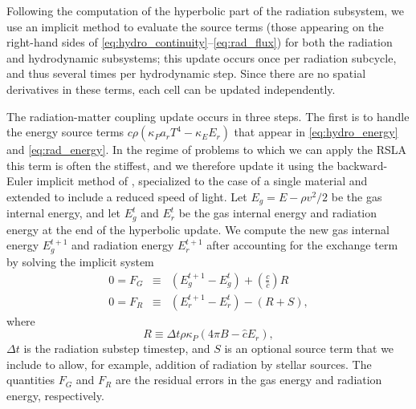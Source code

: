 \documentclass[fleqn,usenatbib]{mnras}
\begin{document}
Following the computation of the hyperbolic part of the radiation subsystem, we use an implicit method to evaluate the source terms (those appearing on the right-hand sides of \autoref{eq:hydro_continuity}--\autoref{eq:rad_flux}) for both the radiation and hydrodynamic subsystems; this update occurs once per radiation subcycle, and thus several times per hydrodynamic step. Since there are no spatial derivatives in these terms, each cell can be updated independently.

The radiation-matter coupling update occurs in three steps. The first is to handle the energy source terms $c\rho (\kappa_P a_r T^4 - \kappa_E E_r)$ that appear in \autoref{eq:hydro_energy} and \autoref{eq:rad_energy}. In the regime of problems to which we can apply the RSLA this term is often the stiffest, and we therefore update it using the backward-Euler implicit method of \cite{Howell_2003}, specialized to the case of a single material and extended to include a reduced speed of light. Let $E_g = E - \rho v^2/2$ be the gas internal energy, and let $E_g^t$ and $E_r^t$ be the gas internal energy and radiation energy at the end of the hyperbolic update. We compute the new gas internal energy $E_g^{t+1}$ and radiation energy $E_r^{t+1}$ after accounting for the exchange term by solving the implicit system
\begin{eqnarray}
0 = F_G &\equiv &(E_g^{t+1} - E_g^{t}) + \left( \frac{c}{\hat c} \right) R \\
0 = F_R &\equiv & (E_{r}^{t+1} - E_{r}^{t}) - \left( R + S \right),
\end{eqnarray}
where 
\begin{equation}
R \equiv \Delta t \rho \kappa_P (4 \pi B - \hat c E_r),
\end{equation}
$\Delta t$ is the radiation substep timestep, and $S$ is an optional source term that we include to allow, for example, addition of radiation by stellar sources. The quantities $F_G$ and $F_R$ are the residual errors in the gas energy and radiation energy, respectively.
\end{document}
